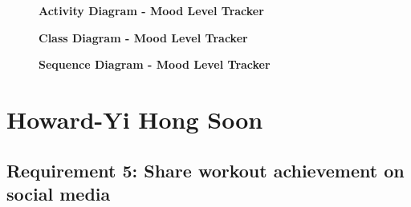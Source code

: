 \documentclass{article}
\begin{document}
\clearpage


\begin{figure}[htbp]
	\textbf{Activity Diagram - Mood Level Tracker}
	\centering
	\begin{subfigure}{\textwidth}
		\resizebox{\textwidth}{!}{}
	\end{subfigure}
	\begin{subfigure}{\textwidth}
	\end{subfigure}
\end{figure}

\clearpage

\begin{figure}[htbp]
	\textbf{Class Diagram - Mood Level Tracker}
	\centering
	\begin{subfigure}{\textwidth}
		\resizebox{\textwidth}{!}{}
	\end{subfigure}
	\begin{subfigure}{\textwidth}
	\end{subfigure}
\end{figure}

\clearpage

\begin{figure}[htbp]
	\textbf{Sequence Diagram - Mood Level Tracker}
	\centering
	\begin{subfigure}{\textwidth}
		\resizebox{\textwidth}{!}{}
	\end{subfigure}
	\begin{subfigure}{\textwidth}
	\end{subfigure}
\end{figure}


\clearpage


\section{Howard-Yi Hong Soon}
		\subsection{Requirement 5: Share workout achievement on social media}
		
\end{document}
